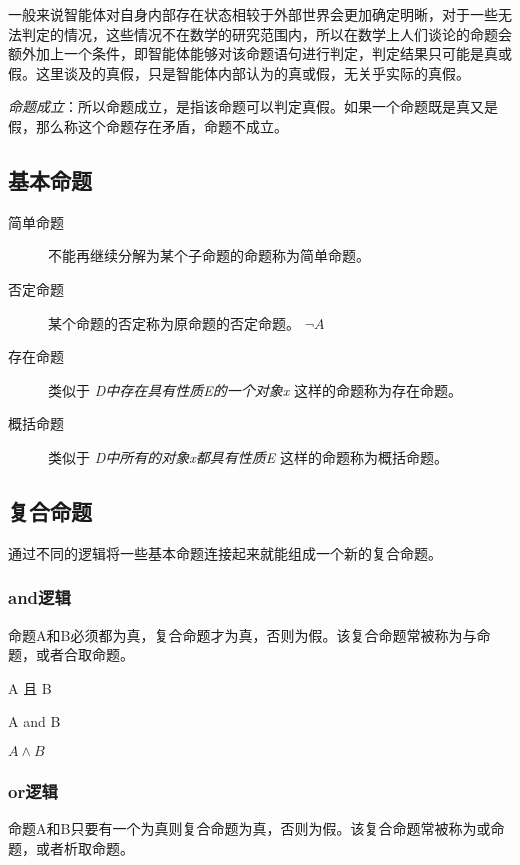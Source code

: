 \documentclass[12pt,oneside]{book}
\begin{document}
一般来说智能体对自身内部存在状态相较于外部世界会更加确定明晰，对于一些无法判定的情况，这些情况不在数学的研究范围内，所以在数学上人们谈论的命题会额外加上一个条件，即智能体能够对该命题语句进行判定，判定结果只可能是真或假。这里谈及的真假，只是智能体内部认为的真或假，无关乎实际的真假。

\emph{命题成立}：所以命题成立，是指该命题可以判定真假。如果一个命题既是真又是假，那么称这个命题存在矛盾，命题不成立。


\subsection{基本命题}

\begin{description}
\item[简单命题] 不能再继续分解为某个子命题的命题称为简单命题。
\item[否定命题] 某个命题的否定称为原命题的否定命题。 $\neg A$
\item[存在命题] 类似于 \textit{D中存在具有性质E的一个对象x} 这样的命题称为存在命题。
\item[概括命题] 类似于 \textit{D中所有的对象x都具有性质E} 这样的命题称为概括命题。
\end{description}

\subsection{复合命题}
通过不同的逻辑将一些基本命题连接起来就能组成一个新的复合命题。


\subsubsection{and逻辑}
命题A和B必须都为真，复合命题才为真，否则为假。该复合命题常被称为与命题，或者合取命题。

\begin{framed}
A 且 B
\end{framed}

\begin{framed}
A and B
\end{framed}

\begin{framed}
$A \wedge B$
\end{framed}

\subsubsection{or逻辑}
命题A和B只要有一个为真则复合命题为真，否则为假。该复合命题常被称为或命题，或者析取命题。
\end{document}
